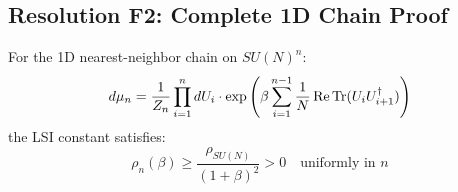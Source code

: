 \subsection{Resolution F2: Complete 1D Chain Proof}
\label{subsec:1d-chain-complete}

\begin{theorem}
\label{thm:1d-complete}
For the 1D nearest-neighbor chain on $SU(N)^n$:
\begin{equation}
d\mu_n = \frac{1}{Z_n} \prod_{i=1}^{n} dU_i \cdot \exp\left(\beta \sum_{i=1}^{n-1} \frac{1}{N}\operatorname{Re}\operatorname{Tr}(U_i U_{i+1}^\dagger)\right)
\end{equation}
the LSI constant satisfies:
\begin{equation}
\boxed{\rho_n(\beta) \geq \frac{\rho_{SU(N)}}{(1 + \beta)^2} > 0 \quad \text{uniformly in } n}
\end{equation}
\end{theorem}

